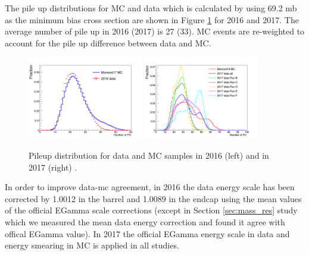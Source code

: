 The pile up distributions for MC and data which is calculated by using 69.2 mb as the minimum bias cross section are shown in Figure \ref{fig:Z_pileup} for 2016 and 2017. The average number of pile up in 2016 (2017) is 27 (33). MC events are re-weighted to account for the pile up difference between data and MC.
\begin{figure}[h!]
  \centering
	\includegraphics[width=0.45\textwidth]{figures/Zprime/PU.png}
    \includegraphics[width=0.45\textwidth]{figures/Zprime/2017_PU.png}
\caption{Pileup distribution for data and MC samples in 2016 (left) and in 2017 (right) .
 \label{fig:Z_pileup}}
\end{figure}

In order to improve data-mc agreement, in 2016 the data energy scale has been corrected by 1.0012 in the barrel and 1.0089 in the endcap using the mean values of the official EGamma scale corrections (except in Section \ref{sec:mass_res} study which we measured the mean data energy correction and found it agree with offical EGamma value). In 2017 the official EGamma energy scale in data and energy smearing in MC is applied in all studies.


